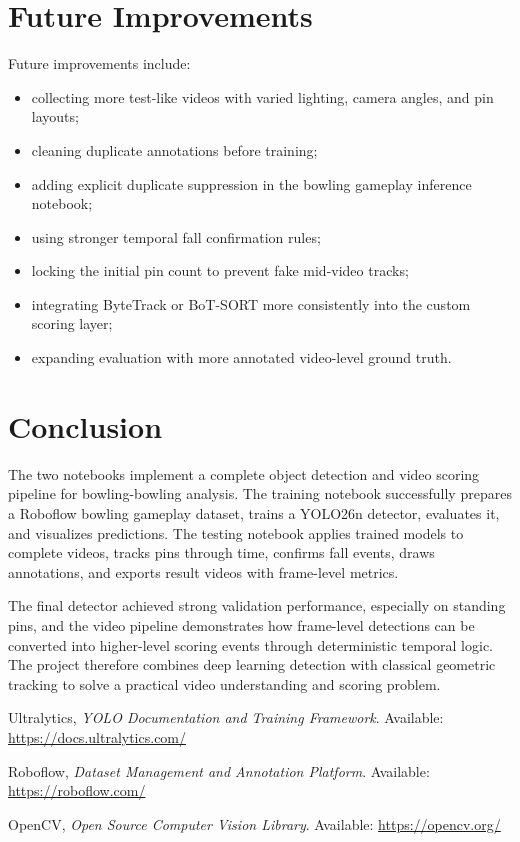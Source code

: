 \documentclass[12pt,a4paper]{article}
\begin{document}

\section{Future Improvements}

Future improvements include:
\begin{itemize}[noitemsep]
    \item collecting more test-like videos with varied lighting, camera angles, and pin layouts;
    \item cleaning duplicate annotations before training;
    \item adding explicit duplicate suppression in the bowling gameplay inference notebook;
    \item using stronger temporal fall confirmation rules;
    \item locking the initial pin count to prevent fake mid-video tracks;
    \item integrating ByteTrack or BoT-SORT more consistently into the custom scoring layer;
    \item expanding evaluation with more annotated video-level ground truth.
\end{itemize}


\section{Conclusion}

The two notebooks implement a complete object detection and video scoring pipeline for bowling-bowling analysis. The training notebook successfully prepares a Roboflow bowling gameplay dataset, trains a YOLO26n detector, evaluates it, and visualizes predictions. The testing notebook applies trained models to complete videos, tracks pins through time, confirms fall events, draws annotations, and exports result videos with frame-level metrics.

The final detector achieved strong validation performance, especially on standing pins, and the video pipeline demonstrates how frame-level detections can be converted into higher-level scoring events through deterministic temporal logic. The project therefore combines deep learning detection with classical geometric tracking to solve a practical video understanding and scoring problem.



Ultralytics, \textit{YOLO Documentation and Training Framework}. Available: \url{https://docs.ultralytics.com/}

Roboflow, \textit{Dataset Management and Annotation Platform}. Available: \url{https://roboflow.com/}

OpenCV, \textit{Open Source Computer Vision Library}. Available: \url{https://opencv.org/}
\end{document}
